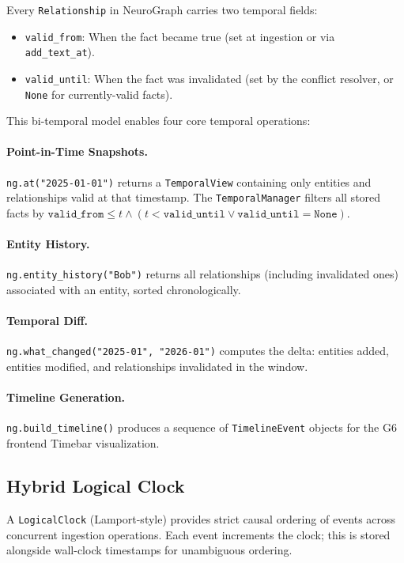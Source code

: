 \documentclass[11pt,twocolumn]{article}
\begin{document}
Every \texttt{Relationship} in NeuroGraph carries two temporal fields:
\begin{itemize}[nosep]
  \item \texttt{valid\_from}: When the fact became true (set at ingestion or via \texttt{add\_text\_at}).
  \item \texttt{valid\_until}: When the fact was invalidated (set by the conflict resolver, or \texttt{None} for currently-valid facts).
\end{itemize}

This bi-temporal model enables four core temporal operations:

\paragraph{Point-in-Time Snapshots.} \texttt{ng.at("2025-01-01")} returns a \texttt{TemporalView} containing only entities and relationships valid at that timestamp. The \texttt{TemporalManager} filters all stored facts by $\texttt{valid\_from} \leq t \wedge (t < \texttt{valid\_until} \vee \texttt{valid\_until} = \texttt{None})$.

\paragraph{Entity History.} \texttt{ng.entity\_history("Bob")} returns all relationships (including invalidated ones) associated with an entity, sorted chronologically.

\paragraph{Temporal Diff.} \texttt{ng.what\_changed("2025-01", "2026-01")} computes the delta: entities added, entities modified, and relationships invalidated in the window.

\paragraph{Timeline Generation.} \texttt{ng.build\_timeline()} produces a sequence of \texttt{TimelineEvent} objects for the G6 frontend Timebar visualization.

\subsection{Hybrid Logical Clock}

A \texttt{LogicalClock} (Lamport-style) provides strict causal ordering of events across concurrent ingestion operations. Each event increments the clock; this is stored alongside wall-clock timestamps for unambiguous ordering.
\end{document}
